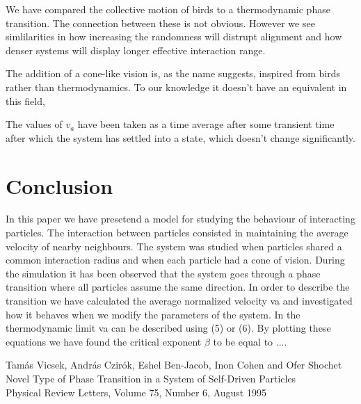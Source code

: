 \documentclass[twoside,twocolumn]{article}
\begin{document}
We have compared the collective motion of birds to a thermodynamic phase transition. The connection between these is not obvious. However we see simlilarities in how increasing the randomness will distrupt alignment and how denser systems will display longer effective interaction range.

The addition of a cone-like vision is, as the name suggests, inspired from birds rather than thermodynamics. To our knowledge it doesn't have an equivalent in this field, 

The values of $v_a$ have been taken as a time average after some transient time after which the system has settled into a state, which doesn't change significantly.




\section{Conclusion}

In this paper we have presetend a model for studying the behaviour of interacting particles. The interaction between particles consisted in maintaining the average velocity of nearby neighbours. The system was studied when particles shared a common interaction radius and when each particle had a cone of vision. During the simulation it has been observed that the system goes through a phase transition where all particles assume the same direction. In order to describe the transition we have calculated the average normalized velocity va and investigated how it behaves when we modify the parameters of the system. In the thermodynamic limit va can be described using (5) or (6).
By plotting these equations we have found  the critical exponent $\beta$ to be equal to ....



\begin{thebibliography}{99} %

  Tamás Vicsek, András Czirók, Eshel Ben-Jacob, Inon Cohen and Ofer Shochet\\
  Novel Type of Phase Transition in a System of Self-Driven Particles\\
  Physical Review Letters, Volume 75, Number 6, August 1995
 
\end{thebibliography}

\end{document}
